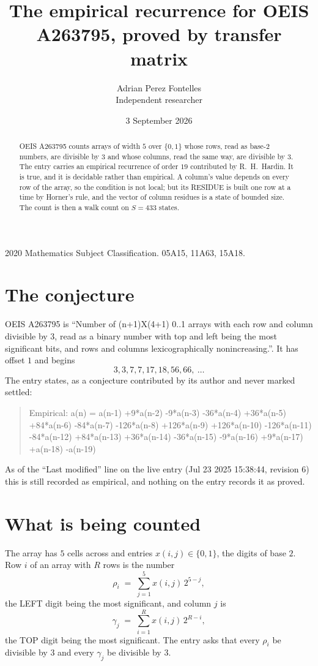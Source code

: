 \documentclass[11pt,a4paper]{article}
\title{The empirical recurrence for OEIS A263795, proved by transfer matrix}
\author{Adrian Perez Fontelles\\ \small Independent researcher}
\date{3 September 2026}
\theoremstyle{plain}
\theoremstyle{definition}
\begin{document}
\maketitle

\begin{abstract}
OEIS A263795 counts arrays of width $5$ over $\{0,1\}$ whose rows, read as base-$2$
numbers, are divisible by $3$ and whose columns, read the same way, are divisible by
$3$. The entry carries an empirical recurrence of order $19$ contributed by
R.~H.~Hardin. It is true, and it is decidable rather than empirical. A column's value depends on
every row of the array, so the condition is not local; but its RESIDUE is built one row at a
time by Horner's rule, and the vector of column residues is a state of bounded size. The count
is then a walk count on $S=433$ states.
\end{abstract}

\noindent\small 2020 Mathematics Subject Classification. 05A15, 11A63, 15A18.\normalsize

\section{The conjecture}

OEIS A263795 is ``Number of (n+1)X(4+1) 0..1 arrays with each row and column divisible by 3, read as a binary number with top and left being the most significant bits, and rows and columns lexicographically nonincreasing.''. It has offset $1$ and begins
\[
3, 3, 7, 7, 17, 18, 56, 66,\ \dots
\]
The entry states, as a conjecture contributed by its author and never marked settled:
\begin{quote}
Empirical: a(n) = a(n-1) +9*a(n-2) -9*a(n-3) -36*a(n-4) +36*a(n-5) +84*a(n-6) -84*a(n-7) -126*a(n-8) +126*a(n-9) +126*a(n-10) -126*a(n-11) -84*a(n-12) +84*a(n-13) +36*a(n-14) -36*a(n-15) -9*a(n-16) +9*a(n-17) +a(n-18) -a(n-19)
\end{quote}
As of the ``Last modified'' line on the live entry (Jul 23 2025 15:38:44, revision 6) this is still
recorded as empirical, and nothing on the entry records it as proved.

\section{What is being counted}

The array has $5$ cells across and entries $x(i,j)\in\{0,1\}$, the digits of
base $2$. Row $i$ of an array with $R$ rows is the number
\[
\rho_i\;=\;\sum_{j=1}^{5}x(i,j)\,2^{5-j} ,
\]
the LEFT digit being the most significant, and column $j$ is
\[
\gamma_j\;=\;\sum_{i=1}^{R}x(i,j)\,2^{R-i} ,
\]
the TOP digit being the most significant. The entry asks that every $\rho_i$ be divisible by
$3$ and every $\gamma_j$ be divisible by $3$.
\end{document}
